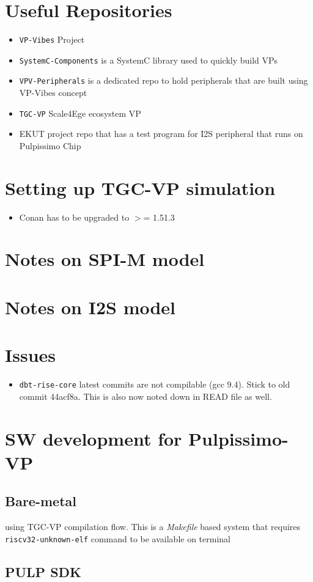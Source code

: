 \documentclass{article}
\begin{document}
\section{Useful Repositories}
\begin{itemize}
 \item \texttt{VP-Vibes} Project
 \item \texttt{SystemC-Components} is a SystemC library used to quickly build VPs
 \item \texttt{VPV-Peripherals} is a dedicated repo to hold peripherals that are built using VP-Vibes concept
 \item \texttt{TGC-VP} Scale4Ege ecosystem VP
 \item EKUT project repo that has a test program for I2S peripheral that runs on Pulpissimo Chip
\end{itemize}

\section{Setting up TGC-VP simulation}
\begin{itemize}
 \item Conan has to be upgraded to $>$= 1.51.3
\end{itemize}

\section{Notes on SPI-M model}

\section{Notes on I2S model}

\section{Issues}
\begin{itemize}
 \item \texttt{dbt-rise-core} latest commits are not compilable (gcc 9.4). Stick to old commit 44acf8a. This is also
       now noted down in READ file as well.
\end{itemize}

\section{SW development for Pulpissimo-VP}
\subsection{Bare-metal}
using TGC-VP compilation flow. This is a \textit{Makefile} based system that requires \texttt{riscv32-unknown-elf}
command to be available on terminal

\subsection{PULP SDK}
\end{document}
